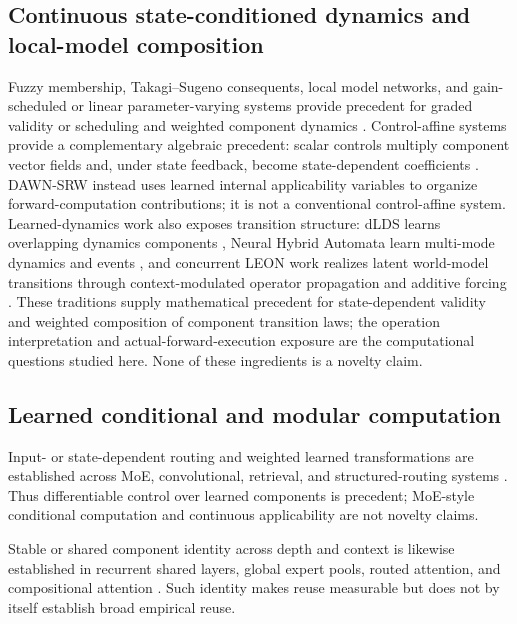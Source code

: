 \documentclass{article}
\newcommand{\DAWN}{DAWN-SRW}
\begin{document}
\subsection{Continuous state-conditioned dynamics and local-model composition}

Fuzzy membership, Takagi--Sugeno consequents, local model networks, and
gain-scheduled or linear parameter-varying systems provide precedent for graded
validity or scheduling and weighted component dynamics
\cite{zadeh1965fuzzy,takagi1985fuzzy,johansen1995identification,
rugh2000research}. Control-affine systems provide a complementary algebraic
precedent: scalar controls multiply component vector fields and, under state
feedback, become state-dependent coefficients \cite{sontag1998mathematical}.
\DAWN{} instead uses learned internal applicability variables to organize
forward-computation contributions; it is not a conventional control-affine
system. Learned-dynamics work also exposes transition structure: dLDS learns
overlapping dynamics components \cite{mudrik2024decomposed}, Neural Hybrid
Automata learn multi-mode dynamics and events \cite{poli2021neural}, and
concurrent LEON work realizes latent world-model transitions through
context-modulated operator propagation and additive forcing
\cite{lu2026making}. These traditions supply mathematical precedent for
state-dependent validity and weighted composition of component transition laws;
the operation interpretation and actual-forward-execution exposure are the
computational questions studied here. None of these ingredients is a novelty
claim.

\subsection{Learned conditional and modular computation}

Input- or state-dependent routing and weighted learned transformations are
established across MoE, convolutional, retrieval, and structured-routing systems
\cite{shazeer2017outrageously,fedus2022switch,shen2023moduleformer,
yang2019condconv,he2024mixture,shi2026omnimoe}. Thus differentiable control over
learned components is precedent; MoE-style conditional computation and
continuous applicability are not novelty claims.

Stable or shared component identity across depth and context is likewise
established in recurrent shared layers, global expert pools, routed attention,
and compositional attention
\cite{dehghani2019universal,csordas2024moeut,chen2026mixture,
huang2026unipool,csordas2024switchhead,yang2025umoe,
mittal2022compositional}. Such identity makes reuse measurable but does not by
itself establish broad empirical reuse.
\end{document}
